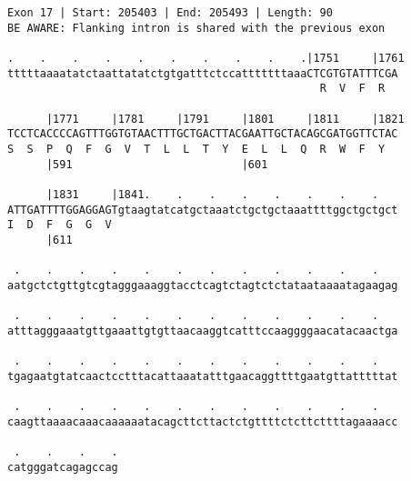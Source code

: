 \documentclass{article}
\begin{document}
\begin{Verbatim}[fontfamily=courier]
Exon 17 | Start: 205403 | End: 205493 | Length: 90
BE AWARE: Flanking intron is shared with the previous exon

.    .    .    .    .    .    .    .    .    .|1751     |1761
tttttaaaatatctaattatatctgtgatttctccatttttttaaaCTCGTGTATTTCGA
                                                R  V  F  R  

      |1771     |1781     |1791     |1801     |1811     |1821
TCCTCACCCCAGTTTGGTGTAACTTTGCTGACTTACGAATTGCTACAGCGATGGTTCTAC
S  S  P  Q  F  G  V  T  L  L  T  Y  E  L  L  Q  R  W  F  Y  
      |591                          |601                    

      |1831     |1841.    .    .    .    .    .    .    .   
ATTGATTTTGGAGGAGTgtaagtatcatgctaaatctgctgctaaattttggctgctgct
I  D  F  G  G  V                                            
      |611                                                  

 .    .    .    .    .    .    .    .    .    .    .    .   
aatgctctgttgtcgtagggaaaggtacctcagtctagtctctataataaaatagaagag

 .    .    .    .    .    .    .    .    .    .    .    .   
atttagggaaatgttgaaattgtgttaacaaggtcatttccaaggggaacatacaactga

 .    .    .    .    .    .    .    .    .    .    .    .   
tgagaatgtatcaactcctttacattaaatatttgaacaggttttgaatgttatttttat

 .    .    .    .    .    .    .    .    .    .    .    .   
caagttaaaacaaacaaaaaatacagcttcttactctgttttctcttcttttagaaaacc

 .    .    .    .
catgggatcagagccag
\end{Verbatim}
\newpage
\end{document}
